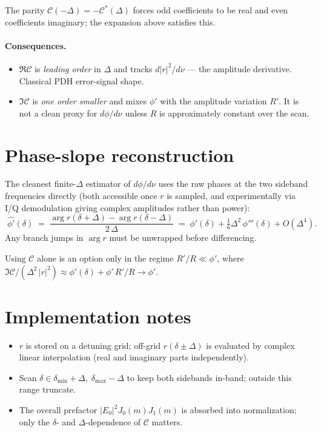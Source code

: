 \documentclass[aps,pra, onecolumn,superscriptaddress,nopacs,floatfix, showkeys, notitlepage]{revtex4-1}
\begin{document}
The parity $\mathcal{C}(-\Delta) = -\mathcal{C}^*(\Delta)$ forces odd
coefficients to be real and even coefficients imaginary; the expansion
above satisfies this.

\paragraph{Consequences.}
\begin{itemize}\setlength\itemsep{2pt}
  \item $\Re\mathcal{C}$ is \emph{leading order} in $\Delta$ and tracks
        $d|r|^2/d\nu$ — the amplitude derivative. Classical PDH
        error-signal shape.
  \item $\Im\mathcal{C}$ is \emph{one order smaller} and mixes $\phi'$ with
        the amplitude variation $R'$. It is not a clean proxy for
        $d\phi/d\nu$ unless $R$ is approximately constant over the scan.
\end{itemize}

\section{Phase-slope reconstruction}

The cleanest finite-$\Delta$ estimator of $d\phi/d\nu$ uses the raw phases
at the two sideband frequencies directly (both accessible once $r$ is
sampled, and experimentally via I/Q demodulation giving complex
amplitudes rather than power):
\begin{equation}
\boxed{\;
    \widehat{\phi'}(\delta)
    \;=\; \frac{\arg r(\delta+\Delta) - \arg r(\delta-\Delta)}{2\,\Delta}
    \;=\; \phi'(\delta) + \tfrac{1}{6}\Delta^2\,\phi'''(\delta) + O(\Delta^4).
\;}
\end{equation}
Any branch jumps in $\arg r$ must be unwrapped before differencing.

Using $\mathcal{C}$ alone is an option only in the regime
$R'\!/R \ll \phi'$, where
$\Im\mathcal{C}/(\Delta^2\,|r|^2) \approx \phi'(\delta) + \phi'\,R'/R \to \phi'$.

\section{Implementation notes}

\begin{itemize}\setlength\itemsep{2pt}
  \item $r$ is stored on a detuning grid; off-grid $r(\delta\pm\Delta)$
        is evaluated by complex linear interpolation (real and imaginary
        parts independently).
  \item Scan $\delta \in \delta_\min + \Delta,\;\delta_\max - \Delta$ to
        keep both sidebands in-band; outside this range truncate.
  \item The overall prefactor $|E_0|^2 J_0(m) J_1(m)$ is absorbed into
        normalization; only the $\delta$- and $\Delta$-dependence of
        $\mathcal{C}$ matters.
\end{itemize}
\end{document}
